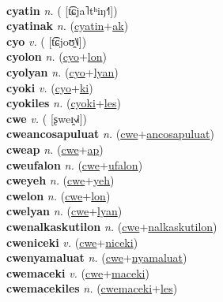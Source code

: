 \label{cyacun} \\
\textbf{cyatin} \textit{n.} ( [t͡ɕja˥tʰiŋ˧˥])
 \label{cyatin} \\
\textbf{cyatinak} \textit{n.} (\hyperref[cyatin]{cyatin}+\hyperref[ak]{ak})
 \label{cyatinak} \\
\textbf{cyo} \textit{v.} ( [t͡ɕjoʊ̯˥˩])
 \label{cyo} \\
\textbf{cyolon} \textit{n.} (\hyperref[cyo]{cyo}+\hyperref[lon]{lon})
 \label{cyolon} \\
\textbf{cyolyan} \textit{n.} (\hyperref[cyo]{cyo}+\hyperref[lyan]{lyan})
 \label{cyolyan} \\
\textbf{cyoki} \textit{v.} (\hyperref[cyo]{cyo}+\hyperref[ki]{ki})
 \label{cyoki} \\
\textbf{cyokiles} \textit{n.} (\hyperref[cyoki]{cyoki}+\hyperref[les]{les})
 \label{cyokiles} \\
\textbf{cwe} \textit{v.} ( [ʂweɪ̯˧˩˧])
 \label{cwe} \\
\textbf{cweancosapuluat} \textit{n.} (\hyperref[cwe]{cwe}+\hyperref[ancosapuluat]{ancosapuluat})
 \label{cweancosapuluat} \\
\textbf{cweap} \textit{n.} (\hyperref[cwe]{cwe}+\hyperref[ap]{ap})
 \label{cweap} \\
\textbf{cweufalon} \textit{n.} (\hyperref[cwe]{cwe}+\hyperref[ufalon]{ufalon})
 \label{cweufalon} \\
\textbf{cweyeh} \textit{n.} (\hyperref[cwe]{cwe}+\hyperref[yeh]{yeh})
 \label{cweyeh} \\
\textbf{cwelon} \textit{n.} (\hyperref[cwe]{cwe}+\hyperref[lon]{lon})
 \label{cwelon} \\
\textbf{cwelyan} \textit{n.} (\hyperref[cwe]{cwe}+\hyperref[lyan]{lyan})
 \label{cwelyan} \\
\textbf{cwenalkaskutilon} \textit{n.} (\hyperref[cwe]{cwe}+\hyperref[nalkaskutilon]{nalkaskutilon})
 \label{cwenalkaskutilon} \\
\textbf{cweniceki} \textit{v.} (\hyperref[cwe]{cwe}+\hyperref[niceki]{niceki})
 \label{cweniceki} \\
\textbf{cwenyamaluat} \textit{n.} (\hyperref[cwe]{cwe}+\hyperref[nyamaluat]{nyamaluat})
 \label{cwenyamaluat} \\
\textbf{cwemaceki} \textit{v.} (\hyperref[cwe]{cwe}+\hyperref[maceki]{maceki})
 \label{cwemaceki} \\
\textbf{cwemacekiles} \textit{n.} (\hyperref[cwemaceki]{cwemaceki}+\hyperref[les]{les})
 \label{cwemacekiles} \\
